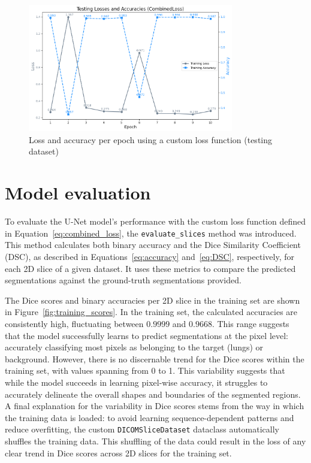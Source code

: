 \documentclass[12pt]{report}
\newcommand{\inlinecode}[1]{\lstinline[style=inline]{#1}}
\begin{document}
\begin{figure}[ht!]
    \centering
    \includegraphics[width=0.8\textwidth]{combinedloss_test.png}
    \caption{Loss and accuracy per epoch using a custom loss function (testing dataset)}
    \label{fig:combined_loss_test}
\end{figure}

\section{Model evaluation}

To evaluate the U-Net model's performance with the custom loss function defined in Equation~\ref{eq:combined_loss}, the \inlinecode{evaluate_slices} method was introduced. This method calculates both binary accuracy and the Dice Similarity Coefficient (DSC), as described in Equations~\ref{eq:accuracy} and~\ref{eq:DSC}, respectively, for each 2D slice of a given dataset. It uses these metrics to compare the predicted segmentations against the ground-truth segmentations provided.

The Dice scores and binary accuracies per 2D slice in the training set are shown in Figure~\ref{fig:training_scores}. In the training set, the calculated accuracies are consistently high, fluctuating between $0.9999$ and $0.9668$. This range suggests that the model successfully learns to predict segmentations at the pixel level: accurately classifying most pixels as belonging to the target (lungs) or background. However, there is no discernable trend for the Dice scores within the training set, with values spanning from 0 to 1. This variability suggests that while the model succeeds in learning pixel-wise accuracy, it struggles to accurately delineate the overall shapes and boundaries of the segmented regions. A final explanation for the variability in Dice scores stems from the way in which the training data is loaded: to avoid learning sequence-dependent patterns and reduce overfitting, the custom \inlinecode{DICOMSliceDataset} dataclass automatically shuffles the training data. This shuffling of the data could result in the loss of any clear trend in Dice scores across 2D slices for the training set.
\end{document}
